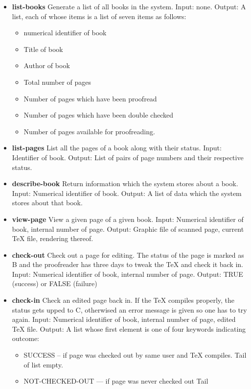 \begin{itemize}
\item
  {\bf list-books}  Generate a list of all books in the system.  Input:
  none.  Output: A list, each of whose items is a list of seven items
  as follows:
  \begin{itemize}
  \item numerical identifier of book 
  \item Title of
    book 
  \item Author of book 
  \item Total number of pages 
  \item
    Number of pages which have been proofread 
  \item Number of pages
    which have been double checked 
  \item Number of pages available for
    proofreading.
  \end{itemize}
\item
  {\bf list-pages}  List all the pages of a book along with their status. 
  Input: Identifier of book.  Output: List of pairs of page numbers and
  their respective status.
\item
  {\bf describe-book}  Return information which the system stores about a
  book.  Input: Numerical identifier of book.  Output: A list of data
  which the system stores about that book.
\item
  {\bf view-page}  View a given page of a given book.  Input: Numerical
  identifier of book, internal number of page.  Output: Graphic file of
  scanned page, current TeX file, rendering thereof.
\item
  {\bf check-out}  Check out a page for editing. The status of the page is
  marked as B and the proofreader has three days to tweak the TeX and
  check it back in.\\  Input: Numerical identifier of book, internal
  number of page.  Output: TRUE (success) or FALSE (failure)
\item
  {\bf check-in}  Check an edited page back in. If the TeX compiles
  properly, the status gets upped to C, otherwised an error message is
  given so one has to try again.  Input: Numerical identifier of book,
  internal number of page, edited TeX file.  Output: A list whose first
  element is one of four keywords indicating outcome:
  \begin{itemize}
  \item SUCCESS
    -- if page was checked out by same user and TeX compiles. Tail of list
    empty. 
  \item NOT-CHECKED-OUT --- if page was never checked out Tail

\end{itemize}
\end{itemize}
